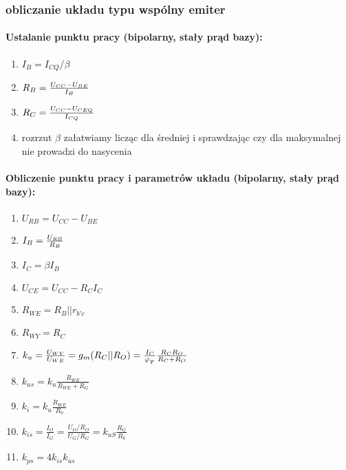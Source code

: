 \documentclass{pdfBooklets}
\begin{document}
\subsubsection{obliczanie układu typu wspólny emiter}

\paragraph{Ustalanie punktu pracy (bipolarny, stały prąd bazy):}
\begin{enumerate}
	\item $I_B = I_{CQ} / \beta$
	\item $R_B = {U_{CC} - U_{BE} \over I_B}$
	\item $R_C = {U_{CC} - U_{CEQ} \over I_{CQ}}$
	\item rozrzut $\beta$ załatwiamy licząc dla średniej i sprawdzając czy dla maksymalnej nie prowadzi do nasycenia
\end{enumerate}

\paragraph{Obliczenie punktu pracy i parametrów układu (bipolarny, stały prąd bazy):}
\begin{enumerate}
	\item $U_{RB} = U_{CC} - U_{BE}$
	\item $I_B = {U_{RB} \over  R_B}$
	\item {\bf $I_C = \beta I_B$}
	\item {\bf $U_{CE} = U_{CC} - R_C I_C$}
	\item $R_{WE} = R_B || r_{b'e}$
	\item $R_{WY} = R_C$
	\item $k_{u} = {U_{WY} \over U_{WE}} = g_m (R_C || R_O) = \frac{I_C}{\varphi_{_T}} \frac{R_C R_O}{R_C + R_O}$
	\item $k_{us} = k_u \frac{R_{WE}}{R_{WE} + R_G}$
	\item $k_{i} =  k_{u} \frac{R_{WE}}{R_{0}}$
	\item $k_{is} = \frac{I_O}{I_G} = \frac{U_O/R_O}{U_G/R_G} = k_{uS} \frac{R_{G}}{R_{0}}$
	\item $k_{ps} = 4 k_{is} k_{us}$
\end{enumerate}
\end{document}
